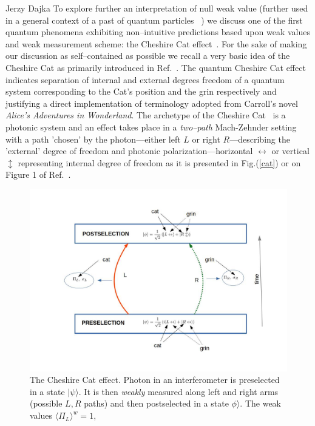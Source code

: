\begin{artengenv}{Jerzy Dajka}
To explore further an interpretation of null weak value (further used in a general context of a past of quantum particles ~\parencite{PhysRevA.95.032110,PhysRevA.97.046102,PhysRevA.97.046103}) we discuss one of the first quantum phenomena exhibiting non--intuitive predictions based upon weak values and weak measurement scheme: the Cheshire Cat effect~\parencite{cat,cat_schlos}. For the sake of making our discussion as self--contained as possible we recall a very basic idea of the  Cheshire Cat as primarily introduced in Ref.~\parencite{cat}.   The quantum Cheshire Cat effect~\parencite{cat} indicates  separation of internal and external degrees freedom of a quantum system corresponding to the Cat's position and the grin respectively and justifying a direct implementation of terminology adopted from Carroll's novel {\it Alice’s Adventures in Wonderland}. 
%
The archetype of the Cheshire Cat~\parencite{cat} is a photonic system and an effect takes place in a {\it two--path} Mach-Zehnder setting with a
path 'chosen' by  the photon---either left $L$ or right $R$---describing the 'external' degree of freedom  and photonic polarization---horizontal $\leftrightarrow$ or vertical $\updownarrow$ representing internal degree of freedom as it is presented in Fig.(\ref{cat}) or on Figure 1 of Ref.~\parencite{cat}. 
\begin{figure}
 \includegraphics[width=1.0\textwidth]{ART_dajka/cat.jpg}%
 \caption{The Cheshire Cat effect. Photon in an interferometer is preselected in a state $|\psi\rangle$.  It is then  {\it weakly} measured along left and right arms (possible $L,R$ paths)  and then postselected in a state $\phi\rangle$. The weak values $
\langle \Pi_L\rangle^w =1$,
}
\end{figure}
\end{artengenv}
